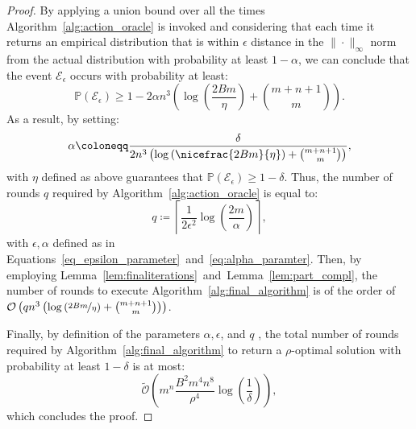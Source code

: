 \begin{proof}
By applying a union bound over all the times Algorithm~\ref{alg:action_oracle} is invoked and considering that each time it returns an empirical distribution that is within $\epsilon$ distance in the $\|\cdot\|_{\infty}$ norm from the actual distribution with probability at least $1-\alpha$, we can conclude that the event $\mathcal{E}_\epsilon$ occurs with probability at least:
\begin{equation*}
	\mathbb{P}(\mathcal{E}_\epsilon)\ge 1- 2 \alpha n^3 \left( \log \left(\frac{2Bm}{\eta}\right) + \binom{ m + n +1}{m} \right).
\end{equation*}  
As a result, by setting:
\begin{equation}\label{eq:alpha_paramter}
\alpha \coloneqq \frac{\delta}{2 n^3 \left( \log \left(\nicefrac{2Bm}{\eta}\right) + \binom{ m + n +1}{m}  \right)},
\end{equation}
with $\eta$ defined as above guarantees that $\mathbb{P}(\mathcal{E}_\epsilon) \ge 1 - \delta$. Thus, the number of rounds $q$ required by Algorithm~\ref{alg:action_oracle} is equal to:
\begin{equation*}
	{q \coloneqq \left\lceil \frac{1}{2 \epsilon^2} \log \left(\frac{2 m}{\alpha}\right) \right\rceil} ,
\end{equation*}
with $\epsilon, \alpha$ defined as in Equations~\eqref{eq_epsilon_parameter}~and~\eqref{eq:alpha_paramter}. Then, by employing Lemma~\ref{lem:finaliterations}~and~Lemma~\ref{lem:part_compl}, the number of rounds to execute Algorithm~\ref{alg:final_algorithm} is of the order of ${\mathcal{O}}\left( q n^3 \left( \log \left(\nicefrac{2Bm}{\eta}\right) + \binom{ m + n +1}{m} \right) \right)$.


Finally, by definition of the parameters $\alpha, \epsilon$, and $q$ , the total number of rounds required by Algorithm~\ref{alg:final_algorithm} to return a $\rho$-optimal solution with probability at least $1-\delta$ is at most:
\begin{equation*}
	\widetilde{\mathcal{O}}\left(   m^n \frac{B^2 m^4 n^8}{\rho^4} \log \left(\frac{1}{\delta}\right) \right),
\end{equation*}
which concludes the proof.

\end{proof}
